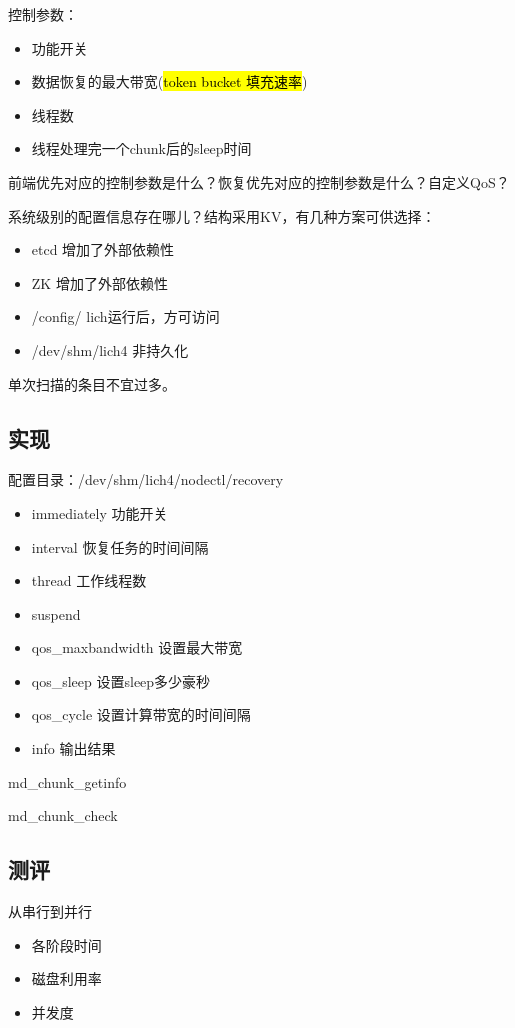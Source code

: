 控制参数：
\begin{itemize}
\item 功能开关
\item 数据恢复的最大带宽(\hl{token bucket 填充速率})
\item 线程数
\item 线程处理完一个chunk后的sleep时间
\end{itemize}

前端优先对应的控制参数是什么？恢复优先对应的控制参数是什么？自定义QoS？

系统级别的配置信息存在哪儿？结构采用KV，有几种方案可供选择：
\begin{itemize}
\item etcd           增加了外部依赖性
\item ZK             增加了外部依赖性
\item /config/       lich运行后，方可访问
\item /dev/shm/lich4 非持久化
\end{itemize}

单次扫描的条目不宜过多。

\subsection{实现}

配置目录：/dev/shm/lich4/nodectl/recovery

\begin{itemize}
\item immediately       功能开关
\item interval          恢复任务的时间间隔
\item thread            工作线程数
\item suspend
\item qos\_maxbandwidth 设置最大带宽
\item qos\_sleep        设置sleep多少豪秒
\item qos\_cycle        设置计算带宽的时间间隔
\item info              输出结果
\end{itemize}

md\_chunk\_getinfo

md\_chunk\_check

\subsection{测评}

从串行到并行

\begin{itemize}
\item 各阶段时间
\item 磁盘利用率
\item 并发度
\end{itemize}

